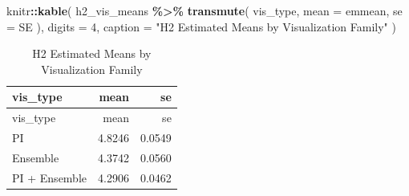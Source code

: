 \documentclass[
]{article}
\newenvironment{Shaded}{\begin{snugshade}}{\end{snugshade}}
\newcommand{\AttributeTok}[1]{\textcolor[rgb]{0.13,0.29,0.53}{#1}}
\newcommand{\DecValTok}[1]{\textcolor[rgb]{0.00,0.00,0.81}{#1}}
\newcommand{\FunctionTok}[1]{\textcolor[rgb]{0.13,0.29,0.53}{\textbf{#1}}}
\newcommand{\NormalTok}[1]{#1}
\newcommand{\SpecialCharTok}[1]{\textcolor[rgb]{0.81,0.36,0.00}{\textbf{#1}}}
\newcommand{\StringTok}[1]{\textcolor[rgb]{0.31,0.60,0.02}{#1}}
\begin{document}
\begin{Shaded}
\begin{Highlighting}[]
\NormalTok{knitr}\SpecialCharTok{::}\FunctionTok{kable}\NormalTok{(}
\NormalTok{  h2\_vis\_means }\SpecialCharTok{\%\textgreater{}\%}
    \FunctionTok{transmute}\NormalTok{(}
\NormalTok{      vis\_type,}
      \AttributeTok{mean =}\NormalTok{ emmean,}
      \AttributeTok{se =}\NormalTok{ SE}
\NormalTok{    ),}
  \AttributeTok{digits =} \DecValTok{4}\NormalTok{,}
  \AttributeTok{caption =} \StringTok{"H2 Estimated Means by Visualization Family"}
\NormalTok{)}
\end{Highlighting}
\end{Shaded}

\begin{longtable}[]{@{}lrr@{}}
\caption{H2 Estimated Means by Visualization Family}\tabularnewline
\toprule\noalign{}
vis\_type & mean & se \\
\midrule\noalign{}
\endfirsthead
\toprule\noalign{}
vis\_type & mean & se \\
\midrule\noalign{}
\endhead
\bottomrule\noalign{}
\endlastfoot
PI & 4.8246 & 0.0549 \\
Ensemble & 4.3742 & 0.0560 \\
PI + Ensemble & 4.2906 & 0.0462 \\
\end{longtable}
\end{document}
